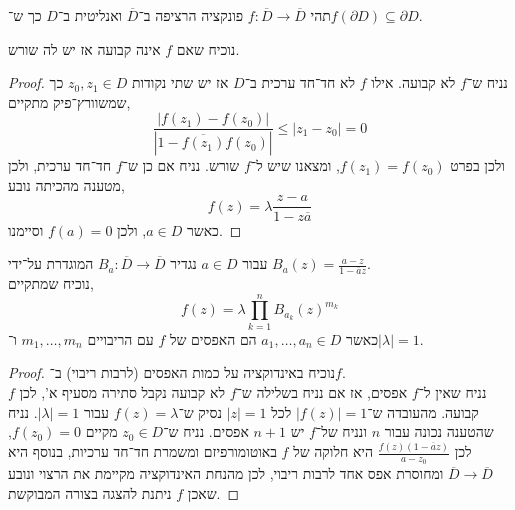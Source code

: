 \question{}
תהי $f : \overline{D} \to \overline{D}$ פונקציה הרציפה ב־$\overline{D}$ ואנליטית ב־$D$ כך ש־$f(\partial D) \subseteq \partial D$.

\subquestion{}
נוכיח שאם $f$ אינה קבועה אז יש לה שורש.
\begin{proof}
	נניח ש־$f$ לא קבועה.
	אילו $f$ לא חד־חד ערכית ב־$D$ אז יש שתי נקודות $z_0, z_1 \in D$ כך שמשוורץ־פיק מתקיים,
	\[
		\frac{|f(z_1) - f(z_0)|}{|1 - \overline{f(z_1)} f(z_0)|} \le |z_1 - z_0| = 0
	\]
	ולכן בפרט $f(z_1) = f(z_0)$, ומצאנו שיש ל־$f$ שורש.
	נניח אם כן ש־$f$ חד־חד ערכית, ולכן מטענה מהכיתה נובע,
	\[
		f(z) = \lambda \frac{z - a}{1 - z \overline{a}}
	\]
	כאשר $a \in D$, ולכן $f(a) = 0$ וסיימנו.
\end{proof}

\subquestion{}
עבור $a \in D$ נגדיר $B_a : \overline{D} \to \overline{D}$ המוגדרת על־ידי $B_a(z) = \frac{a - z}{1 - \overline{a} z}$. \\
נוכיח שמתקיים,
\[
	f(z) = \lambda \prod_{k = 1}^n {B_{a_k}(z)}^{m_k}
\]
כאשר $a_1, \dots, a_n \in D$ הם האפסים של $f$ עם הריבויים $m_1, \dots, m_n$ ו־$|\lambda| = 1$.
\begin{proof}
	נוכיח באינדוקציה על כמות האפסים (לרבות ריבוי) ב־$f$. \\
	נניח שאין ל־$f$ אפסים, אז אם נניח בשלילה ש־$f$ לא קבועה נקבל סתירה מסעיף א', לכן $f$ קבועה. מהעובדה ש־$|f(z)| = 1$ לכל $|z| = 1$ נסיק ש־$f(z) = \lambda$ עבור $|\lambda| = 1$.
	נניח שהטענה נכונה עבור $n$ ונניח של־$f$ יש $n + 1$ אפסים.
	נניח ש־$z_0 \in D$ מקיים $f(z_0) = 0$, לכן $\frac{f(z) (1 - \overline{a} z)}{a - z_0}$ היא חלוקה של $f$ באוטומורפיזם ומשמרת חד־חד ערכיות, בנוסף היא $\overline{D} \to \overline{D}$ ומחוסרת אפס אחד לרבות ריבוי,
	לכן מהנחת האינדוקציה מקיימת את הרצוי ונובע שאכן $f$ ניתנת להצגה בצורה המבוקשת.
\end{proof}


